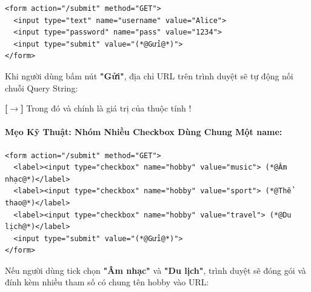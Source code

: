 \begin{codeWindow}
\begin{lstlisting}[language=HTML5]
<form action="/submit" method="GET">
  <input type="text" name="username" value="Alice">
  <input type="password" name="pass" value="1234">
  <input type="submit" value="(*@Gửi@*)">
</form>
\end{lstlisting}
\end{codeWindow}

\begin{browserWindow}
\sffamily\small
Khi người dùng bấm nút \textbf{"Gửi"}, địa chỉ URL trên trình duyệt sẽ tự động nối chuỗi Query String:
\begin{center}
\end{center}
\textcolor{primaryBlue}{\textbf{[$\rightarrow$]}} Trong đó  và  chính là giá trị của thuộc tính !
\end{browserWindow}

\paragraph{Mẹo Kỹ Thuật: Nhóm Nhiều Checkbox Dùng Chung Một name:}

\begin{codeWindow}
\begin{lstlisting}[language=HTML5]
<form action="/submit" method="GET">
  <label><input type="checkbox" name="hobby" value="music"> (*@Âm nhạc@*)</label>
  <label><input type="checkbox" name="hobby" value="sport"> (*@Thể thao@*)</label>
  <label><input type="checkbox" name="hobby" value="travel"> (*@Du lịch@*)</label>
  <input type="submit" value="(*@Gửi@*)">
</form>
\end{lstlisting}
\end{codeWindow}

\begin{noteBox}
Nếu người dùng tick chọn \textbf{"Âm nhạc"} và \textbf{"Du lịch"}, trình duyệt sẽ đóng gói và đính kèm nhiều tham số có chung tên hobby vào URL:
\begin{center}
\end{center}
\end{noteBox}

